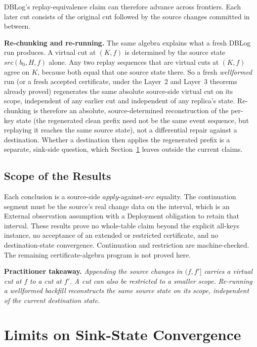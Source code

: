 \documentclass[letterpaper,10pt,twocolumn]{article}
\newcommand{\Apply}{\mathit{apply}}
\newcommand{\Src}{\mathit{src}}
\begin{document}
DBLog's replay-equivalence claim can therefore advance across frontiers.
Each later cut consists of the original cut followed by the source
changes committed in between.

\smallskip
\noindent\textbf{Re-chunking and re-running.} The same algebra explains
what a fresh DBLog run produces. A virtual cut at $(K,f)$ is determined
by the source state $\Src(b_0,H,f)$ alone. Any two replay sequences that
are virtual cuts at $(K,f)$ agree on $K$, because both equal that one
source state there. So a fresh \emph{wellformed} run (or a fresh
accepted certificate, under the Layer~2 and Layer~3 theorems already
proved) regenerates the same absolute source-side virtual cut on its
scope, independent of any earlier cut and independent of any replica's
state. Re-chunking is therefore an absolute, source-determined
reconstruction of the per-key state (the regenerated clean prefix
need not be the same event sequence, but replaying it reaches the same
source state), not a differential repair against a destination.
Whether a destination then applies the regenerated prefix is a
separate, sink-side question, which
Section~\ref{sink-state-convergence-non-claim} leaves outside the
current claims.

\subsection{Scope of the Results}\label{continuation-boundaries}

Each conclusion is a source-side $\Apply$-against-$\Src$ equality. The
continuation segment must be the source's real change data
on the interval, which is an External observation assumption with a
Deployment obligation to retain that interval. These results prove no
whole-table claim beyond the explicit all-keys instance, no acceptance of an
extended or restricted certificate, and no destination-state
convergence. Continuation and restriction are machine-checked. The
remaining certificate-algebra program is not proved here.

\smallskip
\noindent\textbf{Practitioner takeaway.} \emph{Appending the source
changes in $(f,f']$ carries a virtual cut at $f$ to a cut at $f'$. A cut
can also be restricted to a smaller scope. Re-running a wellformed
backfill reconstructs the same source state on its scope, independent of
the current destination state.}

\section{Limits on Sink-State Convergence}\label{sink-state-convergence-non-claim}
\end{document}
